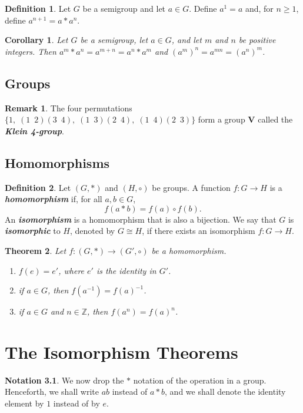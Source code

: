 \documentclass[12pt]{report}
\newtheorem{theorem}{Theorem}[chapter]
\newtheorem{corollary}[theorem]{Corollary}
\theoremstyle{definition}
\newtheorem*{definition}{Definition}
\newtheorem*{notation}{Notation}
\newtheorem*{remark}{Remark}
\newcommand{\term}[1]{\textbf{\textit{#1}}}
\begin{document}
\begin{definition}
	Let $G$ be a semigroup and let $a\in G$. Define $a^1=a$ and, for $n\geq1$, define $a^{n+1}=a\ast a^n$.
\end{definition}

\begin{corollary}
	Let $G$ be a semigroup, let $a\in G$, and let $m$ and $n$ be positive integers. Then $a^m\ast a^n=a^{m+n}=a^n\ast a^m$ and $(a^m)^n=a^{mn}=(a^n)^m$.
\end{corollary}


\section{Groups}
\begin{remark}
	The four permutations $\{1,\;(1\enspace2)(3\enspace4),\;(1\enspace3)(2\enspace4),\;(1\enspace4)(2\enspace3) \}$
	form a group $\mathbf{V}$ called the \term{Klein 4-group}.
\end{remark}

\section{Homomorphisms}
\begin{definition}
	Let $(G,\ast)$ and $(H,\circ)$ be groups. A function $f:G\to H$ is a \term{homomorphism} if, for all $a,b\in G$, \[f(a\ast b)=f(a)\circ f(b).\]
	An \term{isomorphism} is a homomorphism that is also a bijection. We say that $G$ is \term{isomorphic} to $H$, denoted by $G\cong H$, if there exists an isomorphism $f:G\to H$.
\end{definition}

\begin{theorem}
	Let $f:(G,\ast)\to(G',\circ)$ be a homomorphism.
	\begin{enumerate}
		\item $f(e)=e'$, where $e'$ is the identity in $G'$.
		\item if $a\in G$, then $f(a^{-1})=f(a)^{-1}$.
		\item if $a\in G$ and $n\in\mathbb{Z}$, then $f(a^n)=f(a)^n$.
	\end{enumerate}
\end{theorem}



\chapter{The Isomorphism Theorems}
\begin{notation}
	We now drop the $\ast$ notation of the operation in a group. Henceforth, we shall write $ab$ instead of $a\ast b$, and we shall denote the identity element by $1$ instead of by $e$.
\end{notation}
\end{document}
